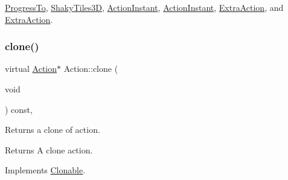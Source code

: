 \hyperlink{classProgressTo_a55a418dbd387fca470d425df87291b0b}{Progress\+To}, \hyperlink{classShakyTiles3D_ad83d154be5494000eb8fcfe657e503ff}{Shaky\+Tiles3D}, \hyperlink{classActionInstant_adb76fc6f006098109e8256210cbd8cc0}{Action\+Instant}, \hyperlink{classActionInstant_adb76fc6f006098109e8256210cbd8cc0}{Action\+Instant}, \hyperlink{classExtraAction_ab934c199930dec4d3bff42d61ce940da}{Extra\+Action}, and \hyperlink{classExtraAction_a758a349952071ad00b74ddf34cfa9b2a}{Extra\+Action}.

\mbox{\label{classAction_a6a047ad6b3bd200b0f86c7bb519b31ea}} 
\subsubsection{\texorpdfstring{clone()}{clone()}\hspace{0.1cm}{\footnotesize\ttfamily [2/2]}}
{\footnotesize\ttfamily virtual \hyperlink{classAction}{Action}$\ast$ Action\+::clone (\begin{DoxyParamCaption}\item[{void}]{ }\end{DoxyParamCaption}) const\hspace{0.3cm}{\ttfamily [inline]}, {\ttfamily [virtual]}}

Returns a clone of action.

\begin{DoxyReturn}{Returns}
A clone action. 
\end{DoxyReturn}


Implements \hyperlink{classClonable_a36b05a0fa605f4f269e5884bde7f9e0c}{Clonable}.



